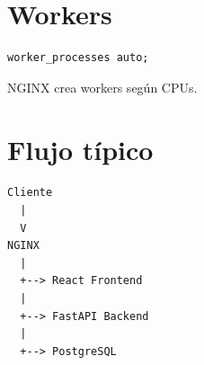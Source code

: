 \documentclass[a4paper,11pt]{article}
\begin{document}

\section*{Workers}

\begin{lstlisting}
worker_processes auto;
\end{lstlisting}

NGINX crea workers según CPUs.


\section*{Flujo típico}

\begin{lstlisting}
Cliente
  |
  V
NGINX
  |
  +--> React Frontend
  |
  +--> FastAPI Backend
  |
  +--> PostgreSQL
\end{lstlisting}

\end{document}
